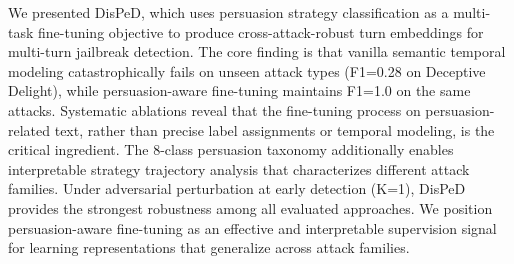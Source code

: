 \documentclass[11pt,a4paper]{article}
\newcommand{\ours}{DisPeD}
\begin{document}
We presented \ours{}, which uses persuasion strategy classification as a multi-task fine-tuning objective to produce cross-attack-robust turn embeddings for multi-turn jailbreak detection. The core finding is that vanilla semantic temporal modeling catastrophically fails on unseen attack types (F1=0.28 on Deceptive Delight), while persuasion-aware fine-tuning maintains F1=1.0 on the same attacks. Systematic ablations reveal that the fine-tuning process on persuasion-related text, rather than precise label assignments or temporal modeling, is the critical ingredient. The 8-class persuasion taxonomy additionally enables interpretable strategy trajectory analysis that characterizes different attack families. Under adversarial perturbation at early detection (K=1), \ours{} provides the strongest robustness among all evaluated approaches. We position persuasion-aware fine-tuning as an effective and interpretable supervision signal for learning representations that generalize across attack families.
\end{document}
